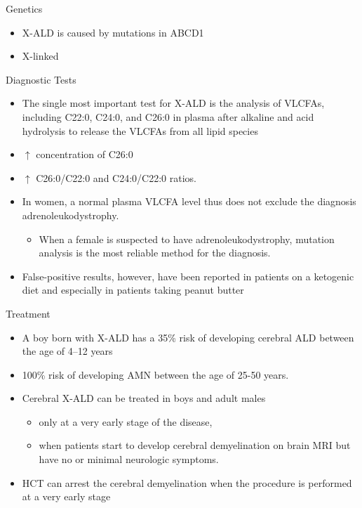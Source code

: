 \documentclass[presentation, smaller]{beamer}
\begin{document}
\begin{frame}[label={sec:org5fe78b7}]{Genetics}
\begin{itemize}
\item X-ALD is caused by mutations in ABCD1
\item X-linked
\end{itemize}
\end{frame}

\begin{frame}[label={sec:orgabb4bff}]{Diagnostic Tests}
\begin{itemize}
\item The single most important test for X-ALD is the analysis of VLCFAs,
including C22:0, C24:0, and C26:0 in plasma after alkaline and acid
hydrolysis to release the VLCFAs from all lipid species

\item \(\uparrow\) concentration of C26:0
\item \(\uparrow\) C26:0/C22:0 and C24:0/C22:0 ratios.
\item In women, a normal plasma VLCFA level thus does not exclude the diagnosis adrenoleukodystrophy.
\begin{itemize}
\item When a female is suspected to have adrenoleukodystrophy, mutation analysis is the most reliable method for the diagnosis.
\end{itemize}

\item False-positive results, however, have been reported in patients on a
ketogenic diet and especially in patients taking peanut butter
\end{itemize}
\end{frame}

\begin{frame}[label={sec:orgdb5585f}]{Treatment}
\begin{itemize}
\item A boy born with X-ALD has a 35\% risk of developing cerebral ALD
between the age of 4–12 years
\item 100\% risk of developing AMN between the age of 25-50 years.
\item Cerebral X-ALD can be treated in boys and adult males
\begin{itemize}
\item only at a very early stage of the disease,
\item when patients start to develop cerebral demyelination on brain MRI
but have no or minimal neurologic symptoms.
\end{itemize}
\item HCT can arrest the cerebral demyelination when the procedure is
performed at a very early stage
\end{itemize}
\end{frame}
\end{document}
